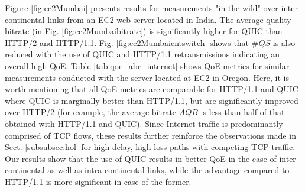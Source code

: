 Figure \ref{fig:ec2Mumbai} presents results for measurements "in the wild" over inter-continental links from an EC2 web server located in India. The average quality bitrate (in Fig. \ref{fig:ec2Mumbaibitrate}) is significantly higher for QUIC than HTTP/2 and HTTP/1.1. Fig. \ref{fig:ec2Mumbaicntswitch} shows that $\#QS$ is also reduced with the use of QUIC and HTTP/1.1 retransmissions indicating an overall high QoE. Table \ref{tab:qoe_abr_internet} shows QoE metrics for similar measurements conducted with the server located at EC2 in Oregon. Here, it is worth mentioning that all QoE metrics are comparable for HTTP/1.1 and QUIC where QUIC is marginally better than HTTP/1.1, but are significantly improved over HTTP/2 (for example, the average bitrate $AQB$ is less than half of that obtained with HTTP/1.1 and QUIC). Since Internet traffic is predominantly comprised of TCP flows, these results further reinforce the observations made in Sect. \ref{subsubsec:hol} for high delay, high loss paths with competing TCP traffic. Our results show that the use of QUIC results in better QoE in the case of inter-continental as well as intra-continental links, while the advantage compared to HTTP/1.1 is more significant in case of the former.

